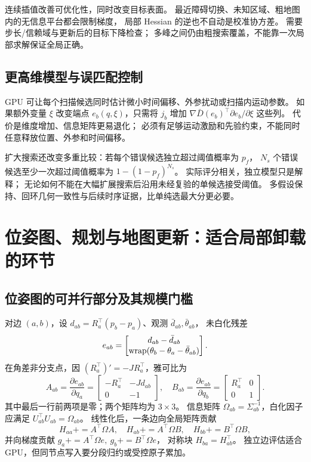 连续插值改善可优化性，同时改变目标表面。
最近障碍切换、未知区域、粗地图内的无信息平台都会限制梯度，
局部 Hessian 的逆也不自动是校准协方差。
需要步长/信赖域与更新后的目标下降检查；
多峰之间仍由粗搜索覆盖，不能靠一次局部求解保证全局正确。

\subsection{更高维模型与误匹配控制}
GPU 可让每个扫描候选同时估计微小时间偏移、外参扰动或扫描内运动参数。
如果额外变量 $\xi$ 改变端点 $e_b(q,\xi)$，只需将
$j_b$ 增加
$\nabla\bar D(e_b)^\top\partial e_b/\partial\xi$ 这些列。
代价是维度增加、信息矩阵更易退化；
必须有足够运动激励和先验约束，不能同时任意释放位置、外参和时间偏移。

扩大搜索还改变多重比较：若每个错误候选独立超过阈值概率为 $p_f$，
$N_s$ 个错误候选至少一次超过阈值概率为
$1-(1-p_f)^{N_s}$。
实际评分相关，独立模型只是解释；
无论如何不能在大幅扩展搜索后沿用未经复验的单候选接受阈值。
多假设保持、回环几何一致性与后续时序证据，比单纯选最大分更必要。

\section{位姿图、规划与地图更新：适合局部卸载的环节}
\subsection{位姿图的可并行部分及其规模门槛}
对边 $(a,b)$，设
$d_{ab}=R_a^\top(p_b-p_a)$、观测 $\bar d_{ab},\bar\theta_{ab}$，
未白化残差
\[
e_{ab}=
\begin{bmatrix}d_{ab}-\bar d_{ab}\\
\operatorname{wrap}(\theta_b-\theta_a-\bar\theta_{ab})\end{bmatrix}.
\]
在角差非分支点，因 $(R_a^\top)'=-JR_a^\top$，雅可比为
\begin{equation}
A_{ab}=\frac{\partial e_{ab}}{\partial q_a}
=\begin{bmatrix}-R_a^\top&-Jd_{ab}\\0&-1\end{bmatrix},
\quad
B_{ab}=\frac{\partial e_{ab}}{\partial q_b}
=\begin{bmatrix}R_a^\top&0\\0&1\end{bmatrix}.
\end{equation}
其中最后一行前两项是零；两个矩阵均为 $3\times3$。
信息矩阵 $\Omega_{ab}=\Sigma_{ab}^{-1}$，白化因子应满足
$U_{ab}^\top U_{ab}=\Omega_{ab}$。
线性化后，一条边向全局矩阵贡献
\[
H_{aa}{+}=A^\top\Omega A,\quad
H_{ab}{+}=A^\top\Omega B,\quad
H_{bb}{+}=B^\top\Omega B,
\]
并向梯度贡献
$g_a{+}=A^\top\Omega e,\ g_b{+}=B^\top\Omega e$，
对称块 $H_{ba}=H_{ab}^\top$。
独立边评估适合 GPU，但同节点写入要分段归约或受控原子累加。

